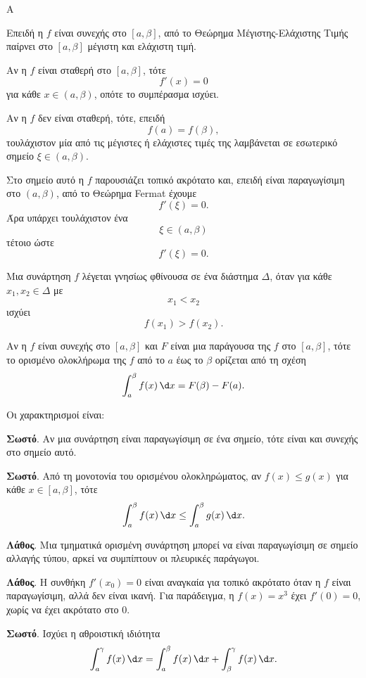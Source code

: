 \begin{thema}{Α}
\begin{erwthma}
\item Επειδή η $f$ είναι συνεχής στο $[a,\beta]$, από το Θεώρημα Μέγιστης-Ελάχιστης Τιμής παίρνει στο $[a,\beta]$ μέγιστη και ελάχιστη τιμή.

Αν η $f$ είναι σταθερή στο $[a,\beta]$, τότε
\[
f'(x)=0
\]
για κάθε $x\in(a,\beta)$, οπότε το συμπέρασμα ισχύει.

Αν η $f$ δεν είναι σταθερή, τότε, επειδή
\[
f(a)=f(\beta),
\]
τουλάχιστον μία από τις μέγιστες ή ελάχιστες τιμές της λαμβάνεται σε εσωτερικό σημείο $\xi\in(a,\beta)$.

Στο σημείο αυτό η $f$ παρουσιάζει τοπικό ακρότατο και, επειδή είναι παραγωγίσιμη στο $(a,\beta)$, από το Θεώρημα Fermat έχουμε
\[
f'(\xi)=0.
\]
Άρα υπάρχει τουλάχιστον ένα
\[
\xi\in(a,\beta)
\]
τέτοιο ώστε
\[
{f'(\xi)=0}.
\]

\item Μια συνάρτηση $f$ λέγεται γνησίως φθίνουσα σε ένα διάστημα $\varDelta$, όταν για κάθε $x_1,x_2\in\varDelta$ με
\[
x_1<x_2
\]
ισχύει
\[
f(x_1)>f(x_2).
\]

\item Αν η $f$ είναι συνεχής στο $[a,\beta]$ και $F$ είναι μια παράγουσα της $f$ στο $[a,\beta]$, τότε το ορισμένο ολοκλήρωμα της $f$ από το $a$ έως το $\beta$ ορίζεται από τη σχέση
\[
\dint_a^\beta f(x)\,\d x=F(\beta)-F(a).
\]

\item Οι χαρακτηρισμοί είναι:
\begin{alist}
\item \textbf{Σωστό}. Αν μια συνάρτηση είναι παραγωγίσιμη σε ένα σημείο, τότε είναι και συνεχής στο σημείο αυτό.
\item \textbf{Σωστό}. Από τη μονοτονία του ορισμένου ολοκληρώματος, αν $f(x)\leq g(x)$ για κάθε $x\in[a,\beta]$, τότε
\[
\dint_a^\beta f(x)\,\d x\leq\dint_a^\beta g(x)\,\d x.
\]
\item \textbf{Λάθος}. Μια τμηματικά ορισμένη συνάρτηση μπορεί να είναι παραγωγίσιμη σε σημείο αλλαγής τύπου, αρκεί να συμπίπτουν οι πλευρικές παράγωγοι.
\item \textbf{Λάθος}. Η συνθήκη $f'(x_0)=0$ είναι αναγκαία για τοπικό ακρότατο όταν η $f$ είναι παραγωγίσιμη, αλλά δεν είναι ικανή. Για παράδειγμα, η $f(x)=x^3$ έχει $f'(0)=0$, χωρίς να έχει ακρότατο στο $0$.
\item \textbf{Σωστό}. Ισχύει η αθροιστική ιδιότητα
\[
\dint_a^\gamma f(x)\,\d x
=
\dint_a^\beta f(x)\,\d x
+
\dint_\beta^\gamma f(x)\,\d x.
\]
\end{alist}
\end{erwthma}
\end{thema}

